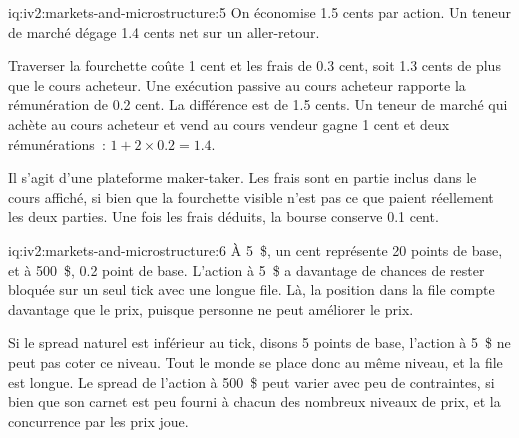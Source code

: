 \begin{solution}{iq:iv2:markets-and-microstructure:5}
On économise 1.5 cents par action. Un teneur de marché dégage 1.4 cents net sur un aller-retour.

Traverser la fourchette coûte 1 cent et les frais de 0.3 cent, soit 1.3 cents de plus que le cours acheteur. Une exécution passive au cours acheteur rapporte la rémunération de 0.2 cent. La différence est de 1.5 cents. Un teneur de marché qui achète au cours acheteur et vend au cours vendeur gagne 1 cent et deux rémunérations~: $1 + 2 \times 0.2 = 1.4$.

Il s'agit d'une plateforme maker-taker. Les frais sont en partie inclus dans le cours affiché, si bien que la fourchette visible n'est pas ce que paient réellement les deux parties. Une fois les frais déduits, la bourse conserve 0.1 cent.

\end{solution}

\begin{solution}{iq:iv2:markets-and-microstructure:6}
À 5~\$, un cent représente 20 points de base, et à 500~\$, 0.2 point de base. L'action à 5~\$ a davantage de chances de rester bloquée sur un seul tick avec une longue file. Là, la position dans la file compte davantage que le prix, puisque personne ne peut améliorer le prix.

Si le spread naturel est inférieur au tick, disons 5 points de base, l'action à 5~\$ ne peut pas coter ce niveau. Tout le monde se place donc au même niveau, et la file est longue. Le spread de l'action à 500~\$ peut varier avec peu de contraintes, si bien que son carnet est peu fourni à chacun des nombreux niveaux de prix, et la concurrence par les prix joue.

\end{solution}

